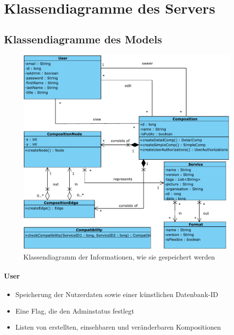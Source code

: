 

\section*{Klassendiagramme des Servers}

\subsection*{Klassendiagramme des Models}
\begin{figure}[!h]
	\centering
	\includegraphics[width=.75\textwidth]{img/Diagramme/Klassen/PureModel}
	\caption{Klassendiagramm der Informationen, wie sie gespeichert werden}
	\label{fig:klassendiagramm-model}
\end{figure}

\newpage
\paragraph{User}
\begin{itemize}
		\item Speicherung der Nutzerdaten sowie einer künstlichen Datenbank-ID
		\item Eine Flag, die den Adminstatus festlegt
		\item Listen von erstellten, einsehbaren und veränderbaren Kompositionen
\end{itemize}

